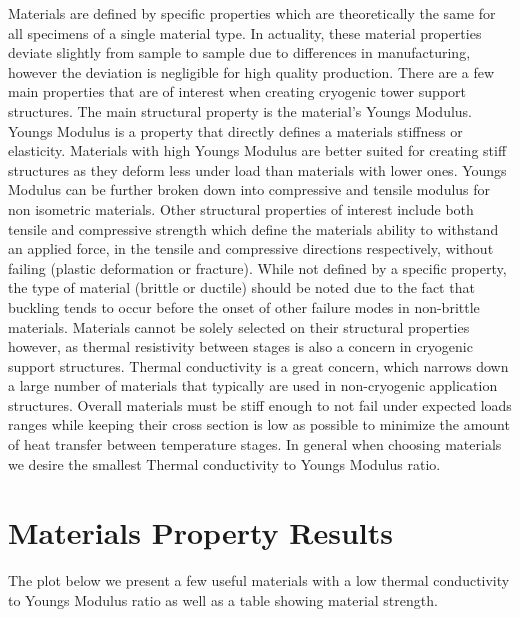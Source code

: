\documentclass[final]{svjour2}
\begin{document}
Materials are defined by specific properties which are theoretically the same for all specimens of a single material type.  In actuality, these material properties deviate slightly from sample to sample due to differences in manufacturing, however the deviation is negligible for high quality production.  There are a few main properties that are of interest when creating cryogenic tower support structures.  The main structural property is the material's Youngs Modulus.  Youngs Modulus is a property that directly defines a materials stiffness or elasticity.  Materials with high Youngs Modulus are better suited for creating stiff structures as they deform less under load than materials with lower ones.  Youngs Modulus can be further broken down into compressive and tensile modulus for non isometric materials. Other structural properties of interest include both tensile and compressive strength which define the materials ability to withstand an applied force, in the tensile and compressive directions respectively, without failing (plastic deformation or fracture).  While not defined by a specific property, the type of material (brittle or ductile) should be noted due to the fact that buckling tends to occur before the onset of other failure modes in non-brittle materials.  Materials cannot be solely selected on their structural properties however, as thermal resistivity between stages is also a concern in cryogenic support structures. Thermal conductivity is a great concern, which narrows down a large number of materials that typically are used in non-cryogenic application structures.  Overall materials must be stiff enough to not fail under expected loads ranges while keeping their cross section is low as possible to minimize the amount of heat transfer between temperature stages.  In general when choosing materials we desire the smallest Thermal conductivity to Youngs Modulus ratio.\cite{Hastings1993}  

\section{Materials Property Results}

The plot below we present a few useful materials with a low thermal conductivity to Youngs Modulus ratio as well as a table showing material strength.\cite{Doty1981}\cite{Kasen1981}\cite{Runyan2008}\cite{Kellaris2013}\cite{Woodcraft2009}\cite{Wood2009}\cite{Ventura2009}
\end{document}
